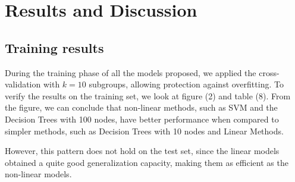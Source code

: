 
\section{Results and Discussion}

\subsection{Training results}

During the training phase of all the models proposed, we applied the cross-validation 
with $k=10$ subgroups, allowing protection against overfitting. To verify the results
on the training set, we look at figure (2) and table (8). From the figure, we can 
conclude that non-linear methods, such as SVM and the Decision Trees with 100 nodes, 
have better performance when compared to simpler methods, such as Decision Trees with 10 
nodes and Linear Methods.

However, this pattern does not hold on the test set, since the linear models obtained 
a quite good generalization capacity, making them as efficient as the non-linear models.